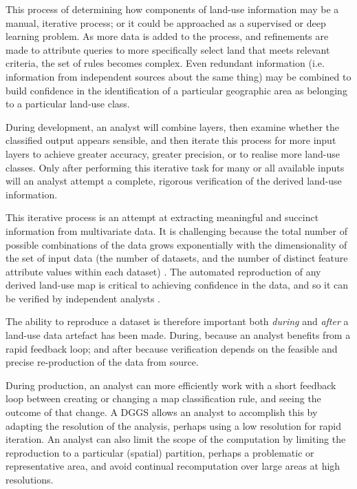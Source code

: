 \documentclass[]{interact}
\theoremstyle{plain}%
\theoremstyle{definition}
\theoremstyle{remark}
\begin{document}
This process of determining how components of land-use information may be a manual, iterative process; or it could be approached as a supervised or deep learning problem. As more data is added to the process, and refinements are made to attribute queries to more specifically select land that meets relevant criteria, the set of rules becomes complex. Even redundant information (i.e. information from independent sources about the same thing) may be combined to build confidence in the identification of a particular geographic area as belonging to a particular land-use class.

During development, an analyst will combine layers, then examine whether the classified output appears sensible, and then iterate this process for more input layers to achieve greater accuracy, greater precision, or to realise more land-use classes. Only after performing this iterative task for many or all available inputs will an analyst attempt a complete, rigorous verification of the derived land-use information. 

This iterative process is an attempt at extracting meaningful and succinct information from multivariate data. It is challenging because the total number of possible combinations of the data grows exponentially with the dimensionality of the set of input data (the number of datasets, and the number of distinct feature attribute values within each dataset) \citep{behrisch2014feedback}. The automated reproduction of any derived land-use map is critical to achieving confidence in the data, and so it can be verified by independent analysts \citep{etherington2022,baker2016}.

The ability to reproduce a dataset is therefore important both \textit{during} and \textit{after} a land-use data artefact has been made. During, because an analyst benefits from a rapid feedback loop; and after because verification depends on the feasible and precise re-production of the data from source.

During production, an analyst can more efficiently work with a short feedback loop between creating or changing a map classification rule, and seeing the outcome of that change. A \ac{DGGS} allows an analyst to accomplish this by adapting the resolution of the analysis, perhaps using a low resolution for rapid iteration. An analyst can also limit the scope of the computation by limiting the reproduction to a particular (spatial) partition, perhaps a problematic or representative area, and avoid continual recomputation over large areas at high resolutions.
\end{document}
